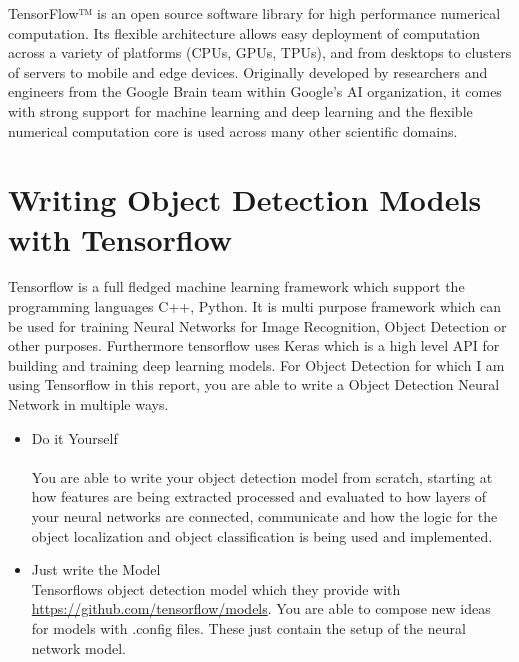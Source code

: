 
TensorFlow™ is an open source software library for high performance numerical computation. Its flexible architecture allows easy deployment
of computation across a variety of platforms (CPUs, GPUs, TPUs), and from desktops to clusters of servers to mobile and edge devices.
Originally developed by researchers and engineers from the Google Brain team within Google’s AI organization, it comes with strong support
for machine learning and deep learning and the flexible numerical computation core is used across many other scientific
domains.\cite{tensorflow}

\section{Writing Object Detection Models with Tensorflow}
Tensorflow is a full fledged machine learning framework which support the programming languages C++, Python. It is multi purpose framework
which can be used for training Neural Networks for Image Recognition, Object Detection or other purposes. Furthermore tensorflow uses
Keras which is a high level API for building and training deep learning models. For Object Detection for which I am using Tensorflow in this
report, you are able to write a Object Detection Neural Network in multiple ways.
\begin{itemize}
    \item Do it Yourself \\ \\
        You are able to write your object detection model from scratch, starting at how features are being extracted processed and
        evaluated to how layers of your neural networks are connected, communicate and how the logic for the object localization and object
        classification is being used and implemented.
    \item Just write the Model \\
        Tensorflows object detection model which they provide with \url{https://github.com/tensorflow/models}. You are able to compose new
        ideas for models with .config files. These just contain the setup of the neural network model.
\end{itemize}

